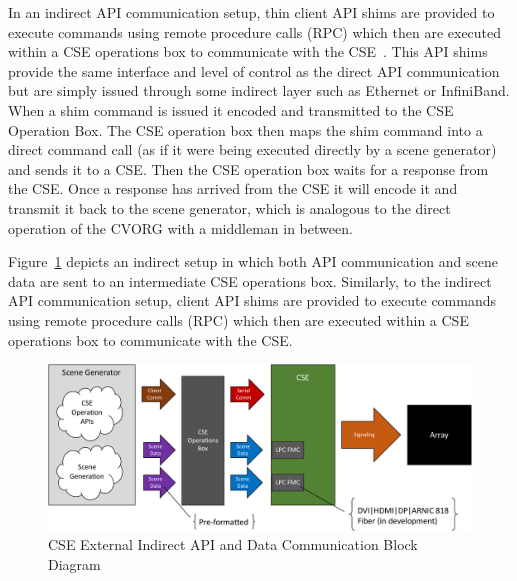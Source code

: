         In an indirect API communication setup, thin client API shims are provided to execute commands using remote procedure calls (RPC) which then are executed within a CSE operations box to communicate with the CSE~\cite{CampbellEtAl2019}. This API shims provide the same interface and level of control as the direct API communication but are simply issued through some indirect layer such as Ethernet or InfiniBand. When a shim command is issued it encoded and transmitted to the CSE Operation Box. The CSE operation box then maps the shim command into a direct command call (as if it were being executed directly by a scene generator) and sends it to a CSE. Then the CSE operation box waits for a response from the CSE. Once a response has arrived from the CSE it will encode it and transmit it back to the scene generator, which is analogous to the direct operation of the CVORG with a middleman in between.

        Figure~\ref{fig:external_cse_comm_indirect} depicts an indirect setup in which both API communication and scene data are sent to an intermediate CSE operations box. Similarly, to the indirect API communication setup, client API shims are provided to execute commands using remote procedure calls (RPC) which then are executed within a CSE operations box to communicate with the CSE.

        \begin{figure}
            \centering
            \includegraphics[width=1.0\textwidth]{fig/external_cse_comm_indirect.pdf}
            \caption{CSE External Indirect API and Data Communication Block Diagram}
            \label{fig:external_cse_comm_indirect}
        \end{figure}

